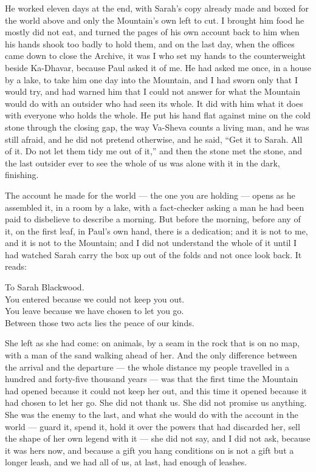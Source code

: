 He worked eleven days at the end, with Sarah's copy already made and boxed for the world above and only the Mountain's own left to cut. I brought him food he mostly did not eat, and turned the pages of his own account back to him when his hands shook too badly to hold them, and on the last day, when the offices came down to close the Archive, it was I who set my hands to the counterweight beside Ka-Dhavar, because Paul asked it of me. He had asked me once, in a house by a lake, to take him one day into the Mountain, and I had sworn only that I would try, and had warned him that I could not answer for what the Mountain would do with an outsider who had seen its whole. It did with him what it does with everyone who holds the whole. He put his hand flat against mine on the cold stone through the closing gap, the way Va-Sheva counts a living man, and he was still afraid, and he did not pretend otherwise, and he said, ``Get it to Sarah. All of it. Do not let them tidy me out of it,'' and then the stone met the stone, and the last outsider ever to see the whole of us was alone with it in the dark, finishing.\par

\ornament

The account he made for the world --- the one you are holding --- opens as he assembled it, in a room by a lake, with a fact-checker asking a man he had been paid to disbelieve to describe a morning. But before the morning, before any of it, on the first leaf, in Paul's own hand, there is a dedication; and it is not to me, and it is not to the Mountain; and I did not understand the whole of it until I had watched Sarah carry the box up out of the folds and not once look back. It reads:\par

\begin{scripture}
To Sarah Blackwood.\\
You entered because we could not keep you out.\\
You leave because we have chosen to let you go.\\
Between those two acts lies the peace of our kinds.
\end{scripture}

She left as she had come: on animals, by a seam in the rock that is on no map, with a man of the sand walking ahead of her. And the only difference between the arrival and the departure --- the whole distance my people travelled in a hundred and forty-five thousand years --- was that the first time the Mountain had opened because it could not keep her out, and this time it opened because it had chosen to let her go. She did not thank us. She did not promise us anything. She was the enemy to the last, and what she would do with the account in the world --- guard it, spend it, hold it over the powers that had discarded her, sell the shape of her own legend with it --- she did not say, and I did not ask, because it was hers now, and because a gift you hang conditions on is not a gift but a longer leash, and we had all of us, at last, had enough of leashes.\par

